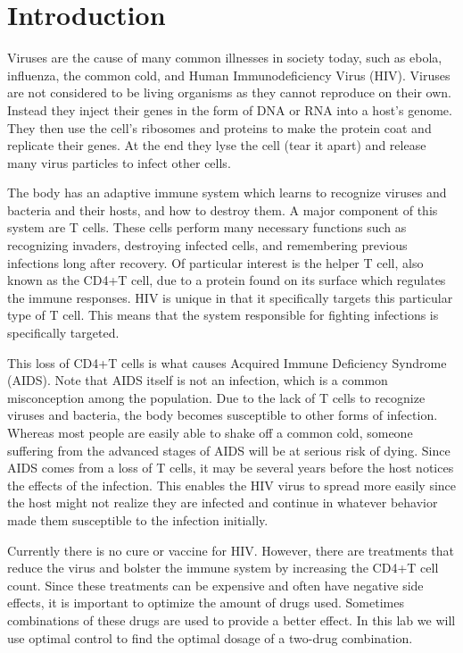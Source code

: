 \label{lab:hiv}


\section*{Introduction}
    Viruses are the cause of many common illnesses in society today, such as ebola, influenza, the common cold, and Human Immunodeficiency Virus (HIV). Viruses are not considered to be living organisms as they cannot reproduce on their own. Instead they inject their genes in the form of DNA or RNA into a host's genome. They then use the cell's ribosomes and proteins to make the protein coat and replicate their genes. At the end they lyse the cell (tear it apart) and release many virus particles to infect other cells.\par
    The body has an adaptive immune system which learns to recognize viruses and bacteria and their hosts, and how to destroy them. A major component of this system are T cells. These cells perform many necessary functions such as recognizing invaders, destroying infected cells, and remembering previous infections long after recovery. Of particular interest is the helper T cell, also known as the CD4+T cell, due to a protein found on its surface which regulates the immune responses. HIV is unique in that it specifically targets this particular type of T cell. This means that the system responsible for fighting infections is specifically targeted.\par
    This loss of CD4+T cells is what causes Acquired Immune Deficiency Syndrome (AIDS). Note that AIDS itself is not an infection, which is a common misconception among the population. Due to the lack of T cells to recognize viruses and bacteria, the body becomes susceptible to other forms of infection. Whereas most people are easily able to shake off a common cold, someone suffering from the advanced stages of AIDS will be at serious risk of dying. Since AIDS comes from a loss of T cells, it may be several years before the host notices the effects of the infection. This enables the HIV virus to spread more easily since the host might not realize they are infected and continue in whatever behavior made them susceptible to the infection initially.\par
   Currently there is no cure or vaccine for HIV. However, there are treatments that reduce the virus and bolster the immune system by increasing the CD4+T cell count. Since these treatments can be expensive and often have negative side effects, it is important to optimize the amount of drugs used. Sometimes combinations of these drugs are used to provide a better effect. In this lab we will use optimal control to find the optimal dosage of a two-drug combination.
   
